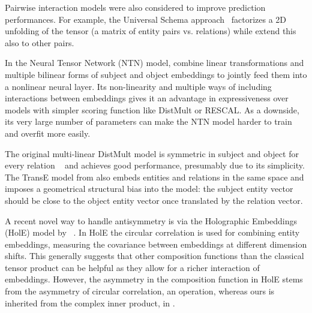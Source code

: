 \documentclass{article}
\begin{document}
Pairwise interaction models were also considered to improve prediction performances. For example, the Universal Schema approach~\cite{riedel_2013_univschema} factorizes a 2D unfolding of the tensor (a matrix of entity pairs vs. relations) while \citet{Welbl2016} extend this also to other pairs.

In the Neural Tensor Network (NTN) model, \citet{socher2013reasoning} combine linear transformations and multiple bilinear forms of subject and object embeddings to jointly feed them into a nonlinear neural layer. Its non-linearity and multiple ways of including interactions between embeddings gives it an advantage in expressiveness over models with simpler scoring function like DistMult or RESCAL. As a downside, its very large number of parameters can make the NTN model harder to train and overfit more easily.

The original multi-linear DistMult model is symmetric in subject and object for every relation ~\cite{Yang2015} and achieves good performance, presumably due to its simplicity.
The TransE model from \citet{bordes2013translating} also embeds entities and relations in the same space and imposes a geometrical structural bias into the model: the subject entity vector should be close to the object entity vector once translated by the relation vector.



A recent novel way to handle antisymmetry is via the Holographic Embeddings (HolE) model by ~\cite{nickel_2016_holographic}. In HolE the circular correlation is used for combining entity embeddings, measuring the covariance between embeddings at different dimension shifts. This generally suggests that other composition functions than the classical tensor product can be  helpful as they allow for a richer interaction of embeddings. However, the asymmetry in the composition function in HolE stems from the asymmetry of circular correlation, an  operation, whereas ours is inherited from the complex inner product, in .
\end{document}
